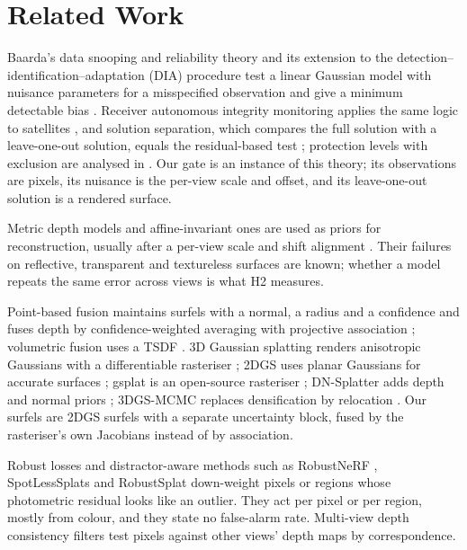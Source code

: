 \section{Related Work}
\label{sup:related}

 Baarda's data snooping and reliability theory and
its extension to the detection--identification--adaptation (DIA) procedure test a linear Gaussian
model with nuisance parameters for a misspecified observation and give a minimum detectable bias
\cite{stat_teunissen_dia}. Receiver autonomous integrity monitoring applies the same logic to
satellites \cite{flt_raim_parkinson,flt_raim_sturza,flt_raim_brown,flt_raim_pervan}, and solution
separation, which compares the full solution with a leave-one-out solution, equals the
residual-based test \cite{flt_raim_joerger}; protection levels with exclusion are analysed in
\cite{flt_araim_pl_exclusion}. Our gate is an instance of this theory; its observations are pixels,
its nuisance is the per-view scale and offset, and its leave-one-out solution is a rendered surface.

 Metric depth models \cite{est_metric3dv2,est_unidepth,est_depthpro} and
affine-invariant ones \cite{est_midas,est_dav2,est_marigold,est_moge} are used as priors for
reconstruction, usually after a per-view scale and shift alignment \cite{rec_monosdf}. Their
failures on reflective, transparent and textureless surfaces are known; whether a model repeats the
same error across views is what H2 measures.

 Point-based fusion maintains surfels with a normal, a radius
and a confidence and fuses depth by confidence-weighted averaging with projective association
\cite{fus_keller_surfels}; volumetric fusion uses a TSDF \cite{fus_curless,fus_kinectfusion}.
3D Gaussian splatting renders anisotropic Gaussians with a differentiable rasteriser
\cite{gs_3dgs}; 2DGS uses planar Gaussians for accurate surfaces \cite{gs_2dgs}; gsplat is an
open-source rasteriser \cite{gs_gsplat}; DN-Splatter adds depth and normal priors \cite{gs_dnsplatter};
3DGS-MCMC replaces densification by relocation \cite{gs_mcmc}. Our surfels are 2DGS surfels with a
separate uncertainty block, fused by the rasteriser's own Jacobians instead of by association.

 Robust losses \cite{rob_blackrangarajan,rob_barron}
and distractor-aware methods such as RobustNeRF \cite{gs_robustnerf}, SpotLessSplats
\cite{gs_spotless} and RobustSplat \cite{gs_robustsplat} down-weight pixels or regions whose
photometric residual looks like an outlier. They act per pixel or per region, mostly from colour,
and they state no false-alarm rate. Multi-view depth consistency filters \cite{fus_merrell,fus_colmap_mvs}
test pixels against other views' depth maps by correspondence.

